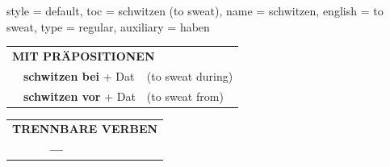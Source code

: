 \begin{verbentry}{
  style = {default},
  toc = {schwitzen (to sweat)},
  name = {schwitzen},
  english = {to sweat},
  type = {regular},
  auxiliary = {haben}
}
\vspace{10pt}

\begin{tabular}{lll}
\multicolumn{3}{l}{\textbf{MIT PRÄPOSITIONEN}}\\
& \textbf{schwitzen bei} + Dat & (to sweat during)\\
& \textbf{schwitzen vor} + Dat & (to sweat from)\\
\end{tabular}
\hfill
\begin{tabular}{lll}
\multicolumn{3}{l}{\textbf{TRENNBARE VERBEN}}\\
& \textbf{---} & \\
\end{tabular}

\vspace{-5pt}
\end{verbentry}

